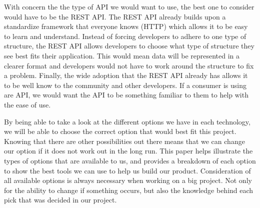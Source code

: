 \documentclass[10pt, onecolumn, draftclsnofoot, letterpaper, compsoc]{IEEEtran}
\begin{document}
With concern the the type of API we would want to use, the best one to consider would have to be the REST API.
The REST API already builds upon a standardize framework that everyone knows (HTTP) which allows it to be easy to learn and understand.
Instead of forcing developers to adhere to one type of structure, the REST API allows developers to choose what type of structure they see best fits their application.
This would mean data will be represented in a clearer format and developers would not have to work around the structure to fix a problem.
Finally, the wide adoption that the REST API already has allows it to be well know to the community and other developers.
If a consumer is using are API, we would want the API to be something familiar to them to help with the ease of use.

By being able to take a look at the different options we have in each technology, we will be able to choose the correct option that would best fit this project. 
Knowing that there are other possibilities out there means that we can change our option if it does not work out in the long run.
This paper helps illustrate the types of options that are available to us, and provides a breakdown of each option to show the best tools we can use to help us build our product.
Consideration of all available options is always necessary when working on a big project.
Not only for the ability to change if something occurs, but also the knowledge behind each pick that was decided in our project.

\newpage


\end{document}
